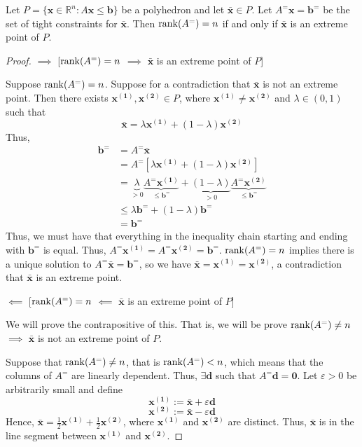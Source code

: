 \begin{thmbox}
    \begin{theorem}
        Let $ P=\{\bm{x}\in\mathbb{R}^n:A \bm{x}\leqslant \bm{b}\} $ be 
        a polyhedron and let $ \bm{\bar{x}}\in P $. 
        Let $ A^=\bm{x} = \bm{b}^= $ be the set of tight constraints
        for $ \bm{\bar{x}} $. 
        Then $ \operatorname{rank}(A^=)=n $ if and only if
        $\bm{\bar{x}}$ is an extreme point of $ P $.
    \end{theorem}
\end{thmbox}

\begin{proof}
    $ \implies $ [$\operatorname{rank}(A^=)=n$ $ \implies $ $\bm{\bar{x}}$ is an extreme point of $ P $]
    
    Suppose $ \operatorname{rank}(A^=)=n $. Suppose for a contradiction that
    $\bm{\bar{x}}$ is not an extreme point. Then there exists
    $ \bm{x^{(1)}}, \bm{x^{(2)}}\in P$, where
    $ \bm{x^{(1)}} \neq \bm{x^{(2)}} $ and $ \lambda\in(0,1) $
    such that
    \[ \bm{\bar{x}}=\lambda \bm{x^{(1)}}+(1-\lambda)\bm{x^{(2)}}\]
    Thus,
    \begin{align*}
        \bm{b^=}&=A^=\bm{\bar{x}}\\
        &=A^=[\lambda \bm{x^{(1)}}+(1-\lambda)\bm{x^{(2)}}]\\
        &=\underbrace{\lambda}_{>0}
        \underbrace{A^=\bm{x^{(1)}}}_{\leqslant \bm{b^=}}
        +\underbrace{(1-\lambda)}_{>0} 
        \underbrace{A^=\bm{x^{(2)}}}_{\leqslant \bm{b^=}}\\
        &\le\lambda\bm{b^=}+(1-\lambda)\bm{b^=}\\
        &=\bm{b^=}
    \end{align*}
    Thus, we must have that everything in the inequality chain
    starting and ending with $ \bm{b^=} $ is equal. Thus,
    $ A^=\bm{x^{(1)}}=A^=\bm{x^{(2)}}=\bm{b^=}$.
    $ \operatorname{rank}(A^=)=n $ implies there is a unique solution
    to $ A^=\bm{\bar{x}}=\bm{b^=}$, so we have 
    $ \bm{\bar{x}}=\bm{x^{(1)}}=\bm{x^{(2)}} $, a contradiction that
    $ \bm{\bar{x}} $ is an extreme point.

    $ \impliedby $ [$\operatorname{rank}(A^=)=n$ $ \impliedby $ $\bm{\bar{x}}$ is an extreme point of $ P $]

    We will prove the contrapositive of this. That is, we will be prove
    $ \operatorname{rank}(A^=)\neq n $ $\implies$ $\bm{\bar{x}}$ is not 
    an extreme point of $ P $.

    Suppose that $ \operatorname{rank}(A^=)\neq n $, that is $ \operatorname{rank}(A^=)<n $, which
    means that the columns of $ A^= $ are linearly dependent. Thus,
    $ \exists \bm{d} $ such that $ A^=\bm{d}=\bm{0} $. Let
    $ \varepsilon > 0 $ be arbitrarily small and define
    \[ \bm{x^{(1)}} := \bm{\bar{x}} + \varepsilon \bm{d} \]
    \[ \bm{x^{(2)}} := \bm{\bar{x}} - \varepsilon \bm{d} \]
Hence, $ \bm{\bar{x}}=\frac{1}{2}\bm{x^{(1)}}+\frac{1}{2} \bm{x^{(2)}} $, where
$ \bm{x^{(1)}} $ and $ \bm{x^{(2)}} $ are distinct. Thus,
$ \bm{\bar{x}} $ is in the line segment between $ \bm{x^{(1)}} $ and
$ \bm{x^{(2)}} $. 


\end{proof}
